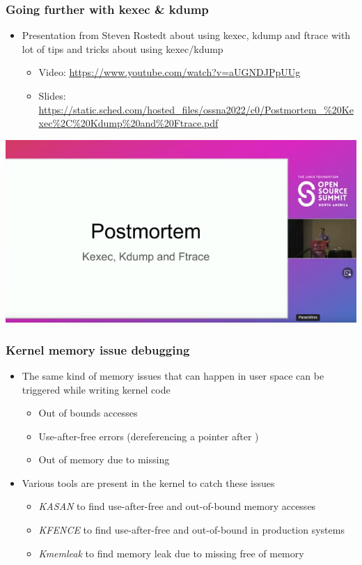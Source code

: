 \begin{frame}[fragile]
  \frametitle{Going further with kexec \& kdump}
  \begin{itemize}
    \item Presentation from Steven Rostedt about using kexec, kdump and ftrace
          with lot of tips and tricks about using kexec/kdump
    \begin{itemize}
      \item Video: \url{https://www.youtube.com/watch?v=aUGNDJPpUUg}
      \item Slides: \url{https://static.sched.com/hosted_files/ossna2022/c0/Postmortem_%20Kexec%2C%20Kdump%20and%20Ftrace.pdf}
    \end{itemize}
  \end{itemize}
  \vspace{0.1cm}
  \begin{center}
  \center\includegraphics[height=0.5\textheight]{slides/debugging-kernel-debugging/kexec_kdump_ftrace.png}
  \end{center}
\end{frame}

\begin{frame}
  \frametitle{Kernel memory issue debugging}
  \begin{itemize}
    \item The same kind of memory issues that can happen in user space can be
          triggered while writing kernel code
    \begin{itemize}
      \item Out of bounds accesses
      \item Use-after-free errors (dereferencing a pointer after )
      \item Out of memory due to missing 
    \end{itemize}
    \item Various tools are present in the kernel to catch these issues
    \begin{itemize}
      \item {\em KASAN} to find use-after-free and out-of-bound memory accesses
      \item {\em KFENCE} to find use-after-free and out-of-bound in production systems
      \item {\em Kmemleak} to find memory leak due to missing free of memory
    \end{itemize}
  \end{itemize}
\end{frame}

